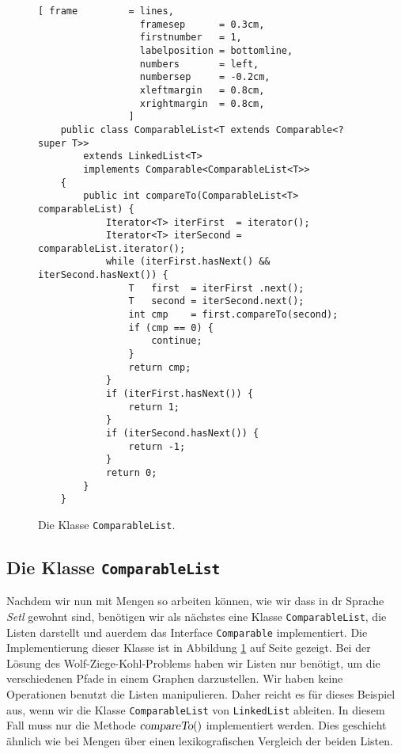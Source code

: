 \begin{figure}[!ht]
\centering
\begin{Verbatim}[ frame         = lines, 
                  framesep      = 0.3cm, 
                  firstnumber   = 1,
                  labelposition = bottomline,
                  numbers       = left,
                  numbersep     = -0.2cm,
                  xleftmargin   = 0.8cm,
                  xrightmargin  = 0.8cm,
                ]
    public class ComparableList<T extends Comparable<? super T>> 
        extends LinkedList<T>
        implements Comparable<ComparableList<T>>
    {
        public int compareTo(ComparableList<T> comparableList) { 
            Iterator<T> iterFirst  = iterator();
            Iterator<T> iterSecond = comparableList.iterator();
            while (iterFirst.hasNext() && iterSecond.hasNext()) {
                T   first  = iterFirst .next();
                T   second = iterSecond.next();
                int cmp    = first.compareTo(second);
                if (cmp == 0) {
                    continue;
                }
                return cmp;
            }
            if (iterFirst.hasNext()) {
                return 1;
            }       
            if (iterSecond.hasNext()) {
                return -1;
            }
            return 0;
        }
    }
\end{Verbatim}
\vspace*{-0.3cm}
\caption{Die Klasse \texttt{ComparableList}.}
\label{fig:ComparableList.java}
\end{figure}

\subsection{Die Klasse \texttt{ComparableList}}
Nachdem wir nun mit Mengen so arbeiten k\"onnen, wie wir dass in dr Sprache \textsl{Setl} gewohnt sind,
ben\"otigen wir als n\"achstes eine Klasse \texttt{ComparableList}, die Listen darstellt und au\3erdem das
Interface \texttt{Comparable} implementiert.  Die Implementierung dieser Klasse ist in Abbildung
\ref{fig:ComparableList.java} auf Seite \pageref{fig:ComparableList.java} gezeigt.  Bei der L\"osung des
Wolf-Ziege-Kohl-Problems haben wir Listen nur ben\"otigt, um die verschiedenen Pfade in einem Graphen
darzustellen.  Wir haben keine Operationen benutzt die Listen manipulieren.  Daher reicht es f\"ur dieses
Beispiel aus, wenn wir die Klasse \texttt{ComparableList} von \texttt{LinkedList} ableiten.  In diesem
Fall muss nur die Methode $\textsl{compareTo}()$ implementiert werden.  Dies geschieht \"ahnlich wie bei
Mengen \"uber einen lexikografischen Vergleich der beiden Listen.
\pagebreak
\vspace*{\fill}

